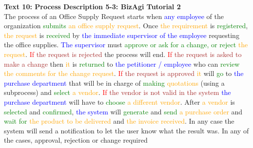 \textbf{Text 10: Process Description 5-3: BizAgi Tutorial 2}\\
The process of an Office Supply Request starts when \textcolor{blue}{any} \textcolor{blue}{employee} of the organization \textcolor{green}{submits} \textcolor{orange}{an} \textcolor{orange}{office} \textcolor{orange}{supply} \textcolor{orange}{request}. Once \textcolor{orange}{the} \textcolor{orange}{requirement} is \textcolor{green}{registered}, \textcolor{orange}{the} \textcolor{orange}{request} is \textcolor{green}{received} by \textcolor{blue}{the} \textcolor{blue}{immediate} \textcolor{blue}{supervisor} \textcolor{blue}{of} \textcolor{blue}{the} \textcolor{blue}{employee} requesting the office supplies. \textcolor{blue}{The} \textcolor{blue}{supervisor} must \textcolor{green}{approve} \textcolor{green}{or} \textcolor{green}{ask} \textcolor{green}{for} \textcolor{green}{a} \textcolor{green}{change}\textcolor{green}{,} \textcolor{green}{or} \textcolor{green}{reject} \textcolor{orange}{the} \textcolor{orange}{request}. \textcolor{red}{If} \textcolor{brown}{the} \textcolor{brown}{request} \textcolor{brown}{is} \textcolor{brown}{rejected} the process will end. \textcolor{red}{If} \textcolor{brown}{the} \textcolor{brown}{request} \textcolor{brown}{is} \textcolor{brown}{asked} \textcolor{brown}{to} \textcolor{brown}{make} \textcolor{brown}{a} \textcolor{brown}{change} then \textcolor{orange}{it} is \textcolor{green}{returned} to \textcolor{blue}{the} \textcolor{blue}{petitioner} \textcolor{blue}{/} \textcolor{blue}{employee} who can \textcolor{green}{review} \textcolor{orange}{the} \textcolor{orange}{comments} \textcolor{orange}{for} \textcolor{orange}{the} \textcolor{orange}{change} \textcolor{orange}{request}. \textcolor{red}{If} \textcolor{brown}{the} \textcolor{brown}{request} \textcolor{brown}{is} \textcolor{brown}{approved} \textcolor{orange}{it} will \textcolor{green}{go} to \textcolor{blue}{the} \textcolor{blue}{purchase} \textcolor{blue}{department} that will be in charge of \textcolor{green}{making} \textcolor{orange}{quotations} (using a subprocess) and \textcolor{green}{select} \textcolor{orange}{a} \textcolor{orange}{vendor}. \textcolor{red}{If} \textcolor{brown}{the} \textcolor{brown}{vendor} \textcolor{brown}{is} \textcolor{brown}{not} \textcolor{brown}{valid} \textcolor{brown}{in} \textcolor{brown}{the} \textcolor{brown}{system} \textcolor{blue}{the} \textcolor{blue}{purchase} \textcolor{blue}{department} will have to \textcolor{green}{choose} \textcolor{orange}{a} \textcolor{orange}{different} \textcolor{orange}{vendor}. After \textcolor{orange}{a} \textcolor{orange}{vendor} is \textcolor{green}{selected} and \textcolor{green}{confirmed}, \textcolor{blue}{the} \textcolor{blue}{system} will \textcolor{green}{generate} and \textcolor{green}{send} \textcolor{orange}{a} \textcolor{orange}{purchase} \textcolor{orange}{order} and \textcolor{green}{wait} \textcolor{green}{for} \textcolor{orange}{the} \textcolor{orange}{product} \textcolor{orange}{to} \textcolor{orange}{be} \textcolor{orange}{delivered} and \textcolor{orange}{the} \textcolor{orange}{invoice} \textcolor{orange}{received}. In any case the system will send a notification to let the user know what the result was. In any of the cases, approval, rejection or change required 